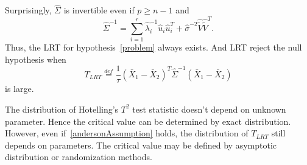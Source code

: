 Surprisingly, $\hat{\Sigma}$ is invertible even if $p\geq n-1$ and 
$$
\hat{\Sigma}^{-1}=\sum_{i=1}^r \hat{\lambda}_i^{-1} \hat{u}_i \hat{u}_i^T
    +\hat{\sigma}^{-2} \hat{\tilde{V}}\hat{\tilde{V}}^T.
$$
Thus, the LRT for hypothesis~\eqref{problem} always exists. And LRT reject the null hypothesis when
$$
T_{LRT}\overset{def}{=}\frac{1}{\tau}(\bar{X}_1-\bar{X}_2)^T \hat{\Sigma}^{-1}(\bar{X}_1-\bar{X}_2)
$$
is large.

The distribution of Hotelling's $T^2$ test statistic doesn't depend on unknown parameter.
Hence the critical value can be determined by exact distribution.
However, even if~\eqref{andersonAssumption} holds, the distribution of
$
T_{LRT}
$
still depends on parameters.
The critical value may be defined by asymptotic distribution or randomization methods.










